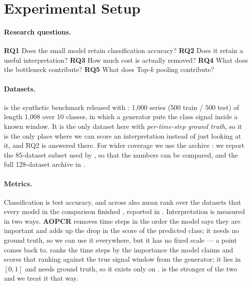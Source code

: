 %

\section{Experimental Setup}
\label{sec:setup}

\paragraph{Research questions.}
\textbf{RQ1} Does the small model retain classification accuracy? \textbf{RQ2} Does it retain a
useful interpretation? \textbf{RQ3} How much cost is actually removed? \textbf{RQ4} What does the
bottleneck contribute? \textbf{RQ5} What does \mbox{Top-$k$} pooling contribute?

\paragraph{Datasets.}
\webtraffic{} is the synthetic benchmark released with \millet{} \citep{early2024millet}: 1{,}000
series (500 train / 500 test) of length 1{,}008 over 10 classes, in which a generator puts the class
signal inside a known window. It is the only dataset here with \emph{per-time-step ground truth}, so
it is the only place where we can score an interpretation instead of just looking at it, and RQ2 is
answered there. For wider coverage we use the \ucr{} archive \citep{dau2019ucr}: we report the
85-dataset subset used by \millet{}, so that the numbers can be compared, and the full 128-dataset
archive in .

\paragraph{Metrics.}
Classification is test accuracy, and across \ucr{} also mean rank over the datasets that every model
in the comparison finished \citep{demsar2006statistical}, reported in . Interpretation
is measured in two ways. \textbf{AOPCR} \citep{samek2017aopc} removes time steps in the order the
model says they are important and adds up the drop in the score of the predicted class; it needs no
ground truth, so we can use it everywhere, but it has no fixed scale --- a point 
comes back to. \textbf{\ndcg{}} \citep{jarvelin2002ndcg} ranks the time steps by the importance the
model claims and scores that ranking against the true signal window from the generator; it lies in
$[0,1]$ and needs ground truth, so it exists only on \webtraffic{}. \ndcg{} is the stronger of the
two and we treat it that way.

